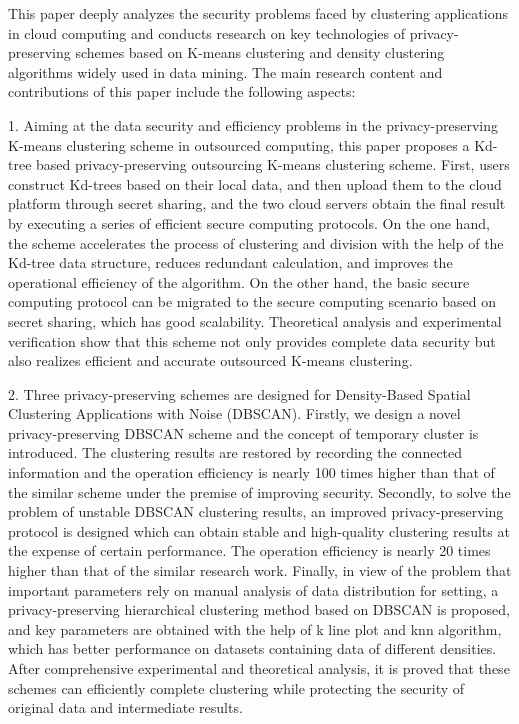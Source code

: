 \begin{eabstract}
This paper deeply analyzes the security problems faced by clustering applications in cloud computing and conducts research on key technologies of privacy-preserving schemes based on K-means clustering and density clustering algorithms widely used in data mining. The main research content and contributions of this paper include the following aspects:

1. Aiming at the data security and efficiency problems in the privacy-preserving K-means clustering scheme in outsourced computing, this paper proposes a Kd-tree based privacy-preserving outsourcing K-means clustering scheme. First, users construct Kd-trees based on their local data, and then upload them to the cloud platform through secret sharing, and the two cloud servers obtain the final result by executing a series of efficient secure computing protocols. On the one hand, the scheme accelerates the process of clustering and division with the help of the Kd-tree data structure, reduces redundant calculation, and improves the operational efficiency of the algorithm. On the other hand, the basic secure computing protocol can be migrated to the secure computing scenario based on secret sharing, which has good scalability. Theoretical analysis and experimental verification show that this scheme not only provides complete data security but also realizes efficient and accurate outsourced K-means clustering.

2. Three privacy-preserving schemes are designed for Density-Based Spatial Clustering Applications with Noise (DBSCAN). Firstly, we design a novel privacy-preserving DBSCAN scheme and the concept of temporary cluster is introduced. The clustering results are restored by recording the connected information and the operation efficiency is nearly 100 times higher than that of the similar scheme under the premise of improving security. 
Secondly, to solve the problem of unstable DBSCAN clustering results, an improved privacy-preserving protocol is designed which can obtain stable and high-quality clustering results at the expense of certain performance. The operation efficiency is nearly 20 times higher than that of the similar research work. 
Finally, in view of the problem that important parameters rely on manual analysis of data distribution for setting, a privacy-preserving hierarchical clustering method based on DBSCAN is proposed, and key parameters are obtained with the help of k line plot and knn algorithm, which has better performance on datasets containing data of different densities. After comprehensive experimental and theoretical analysis, it is proved that these schemes can efficiently complete clustering while protecting the security of original data and intermediate results.   
\end{eabstract}

